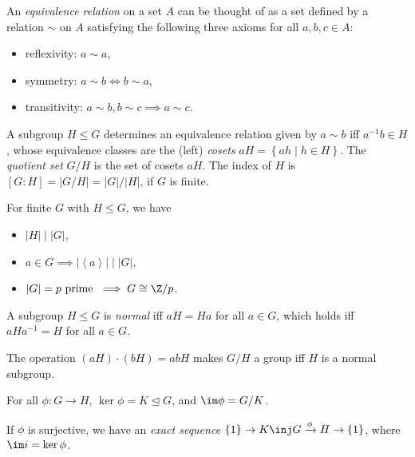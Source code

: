 \documentclass{notes}
\begin{document}
\begin{digression}
    An \emph{equivalence relation} on a set $A$ can be thought of as a set defined by a relation $\sim $ on $A$ satisfying the following three axioms for all $a,b,c\in A$:
    \begin{itemize}
        \item reflexivity: $a\sim a$,
        \item symmetry: $a\sim b\iff b\sim a$,
        \item transitivity: $a\sim b,b\sim c\implies a\sim c$.
    \end{itemize}
\end{digression}

\begin{theorem}
    A subgroup $H\le G$ determines an equivalence relation given by $a\sim b$ iff $a^{-1}b\in H$, whose equivalence classes are the (left) \emph{cosets} $aH=\left\{ ah\mid  h\in H \right\} $.
    The \emph{quotient set} $G/H$ is the set of cosets $aH$. The index of $H$ is $\left[ G:H \right] =|G/H|=|G|/|H|$, if $G$ is finite.
\end{theorem}

\begin{corollary}
    For finite $G$ with $H\le G$, we have
    \begin{itemize}
        \item $|H| \mid  |G|$,
        \item $a\in G\implies |\left\langle a \right\rangle| \mid  |G|$,
        \item $|G|=p \text{ prime }\implies G\cong \Z/p$.
    \end{itemize}
\end{corollary}

\begin{defn}
    A subgroup $H\le G$ is \emph{normal} iff $aH=Ha$ for all $a\in G$, which holds iff $aHa^{-1}=H$ for all $a\in G$.
\end{defn}

\begin{theorem}
    The operation $(aH)\cdot (bH)=abH$ makes $G/H$ a group iff $H$ is a normal subgroup.
\end{theorem}

\begin{theorem}
    For all $\phi \colon G \to H $, $\ker \phi =K \trianglelefteq G$, and $\im \phi =G/K$.

    If $\phi $ is surjective, we have an \emph{exact sequence} $\{1\}\to K\inj G\xrightarrow{\phi } H\to \{1\}$, where $\im i=\ker \phi $.
\end{theorem}
\end{document}
